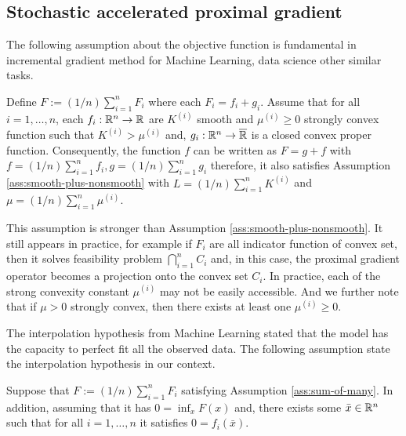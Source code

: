 \documentclass[12pt]{article}
\begin{document}
    \subsection{Stochastic accelerated proximal gradient}
        The following assumption about the objective function is fundamental in incremental gradient method for Machine Learning, data science other similar tasks. 
        \begin{assumption}\label{ass:sum-of-many}
            Define $F := (1/n)\sum_{i = 1}^{n} F_i$ where each $F_i = f_i + g_i$.
            Assume that for all $i = 1, \ldots, n$, each $f_i:\mathbb R^n \rightarrow \mathbb R$ are $K^{(i)}$ smooth and $\mu^{(i)} \ge 0$ strongly convex function such that $K^{(i)} > \mu^{(i)}$ and, $g_i:\mathbb R^n \rightarrow \overline {\mathbb R}$ is a closed convex proper function. 
            Consequently, the function $f$ can be written as $F = g + f$ with $f = (1/n)\sum_{i = 1}^{n} f_i, g = (1/n)\sum_{i = 1}^{n}g_i$ therefore, it also satisfies Assumption \ref{ass:smooth-plus-nonsmooth} with $L = (1/n)\sum_{i = 1}^n K^{(i)}$ and $\mu = (1/n)\sum_{i = 1}^{n}\mu^{(i)}$. 
        \end{assumption}
        This assumption is stronger than Assumption \ref{ass:smooth-plus-nonsmooth}. 
        It still appears in practice, for example if $F_i$ are all indicator function of convex set, then it solves feasibility problem $\bigcap_{i = 1}^n C_i$ and, in this case, the proximal gradient operator becomes a projection onto the convex set $C_i$. 
        In practice, each of the strong convexity constant $\mu^{(i)}$ may not be easily accessible. 
        And we further note that if $\mu > 0$ strongly convex, then there exists at least one $\mu^{(i)} \ge 0$. 
        \par
        The interpolation hypothesis from Machine Learning stated that the model has the capacity to perfect fit all the observed data. 
        The following assumption state the interpolation hypothesis in our context. 
        \begin{assumption}\label{ass:interp-hypothesis}
            Suppose that $F := (1/n)\sum_{i = 1}^{n} F_i$ satisfying Assumption \ref{ass:sum-of-many}. 
            In addition, assuming that it has $0 = \inf_{x}F(x)$ and, there exists some $\bar x \in \mathbb R^n$ such that for all $i = 1, \ldots, n$ it satisfies $0 = f_i(\bar x)$. 
        \end{assumption}
\end{document}
